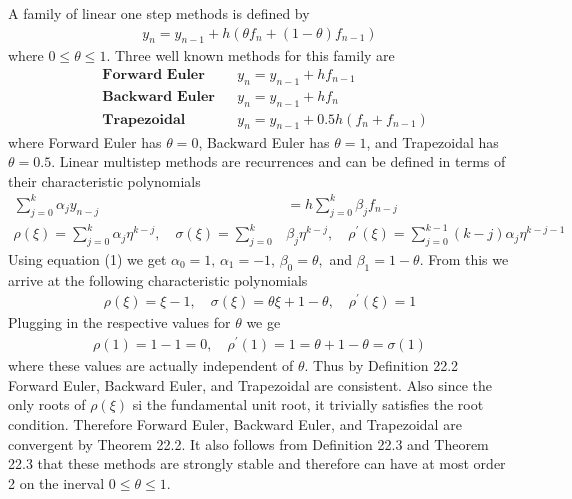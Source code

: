 \documentclass[12pt]{article}
\theoremstyle{remark}
\begin{document}
A family of linear one step methods is defined by
\begin{align}
	y_n = y_{n-1} + h(\theta f_n + (1 - \theta)f_{n-1})
\end{align}
where $0 \leq \theta \leq 1$. Three well known methods for this family are 
\begin{align}
	& \textbf{Forward Euler} && y_n = y_{n-1} + hf_{n-1} \\
	& \textbf{Backward Euler} && y_n = y_{n-1} + hf_n \\
	& \textbf{Trapezoidal} && y_n = y_{n-1} + 0.5h(f_{n} + f_{n-1})
\end{align}
where Forward Euler has $\theta = 0$, Backward Euler has $\theta = 1$, and Trapezoidal has $\theta = 0.5$. Linear multistep methods are recurrences and can be defined in terms of their characteristic polynomials
\begin{align*}
	\sum\limits_{j=0}^k \alpha_jy_{n-j} & = h\sum\limits_{j=0}^k \beta_jf_{n-j} \\
	\rho(\xi) = \sum\limits_{j=0}^k \alpha_j\eta^{k-j}, \quad \sigma(\xi) = \sum\limits_{j=0}^k &\beta_j\eta^{k-j}, \quad \rho^\prime(\xi) = \sum\limits_{j=0}^{k-1} (k-j)\alpha_j\eta^{k-j-1}
\end{align*}
Using equation (1) we get $\alpha_0 = 1, \, \alpha_1 = -1, \, \beta_0 = \theta,$ and $\beta_1 = 1 - \theta$. From this we arrive at the following characteristic polynomials
\begin{align*}
	\rho(\xi) = \xi - 1, \quad \sigma(\xi) = \theta\xi + 1 - \theta, \quad \rho^\prime(\xi) = 1
\end{align*}
Plugging in the respective values for $\theta$ we ge
\begin{align*}
	\rho(1) = 1 - 1 = 0, \quad \rho^\prime(1) = 1 = \theta + 1 - \theta = \sigma(1) 
\end{align*} 
where these values are actually independent of $\theta$. Thus by Definition 22.2 Forward Euler, Backward Euler, and Trapezoidal are consistent. Also since the only roots of $\rho(\xi)$ si the fundamental unit root, it trivially satisfies the root condition. Therefore Forward Euler, Backward Euler, and Trapezoidal are convergent by Theorem 22.2. It also follows from Definition 22.3 and Theorem 22.3 that these methods are strongly stable and therefore can have at most order 2 on the inerval $0 \leq \theta \leq 1$. \\ 
\end{document}
